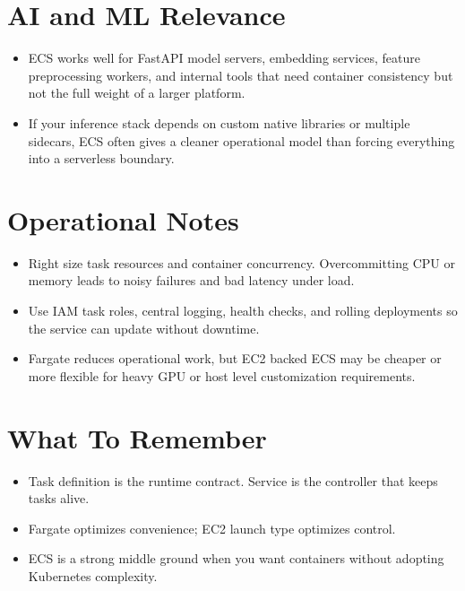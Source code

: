 \documentclass[10pt,twocolumn]{article}
\begin{document}
\section*{AI and ML Relevance}
\begin{itemize}
\item ECS works well for FastAPI model servers, embedding services, feature preprocessing workers, and internal tools that need container consistency but not the full weight of a larger platform.
\item If your inference stack depends on custom native libraries or multiple sidecars, ECS often gives a cleaner operational model than forcing everything into a serverless boundary.
\end{itemize}

\section*{Operational Notes}
\begin{itemize}
\item Right size task resources and container concurrency. Overcommitting CPU or memory leads to noisy failures and bad latency under load.
\item Use IAM task roles, central logging, health checks, and rolling deployments so the service can update without downtime.
\item Fargate reduces operational work, but EC2 backed ECS may be cheaper or more flexible for heavy GPU or host level customization requirements.
\end{itemize}

\section*{What To Remember}
\begin{itemize}
\item Task definition is the runtime contract. Service is the controller that keeps tasks alive.
\item Fargate optimizes convenience; EC2 launch type optimizes control.
\item ECS is a strong middle ground when you want containers without adopting Kubernetes complexity.
\end{itemize}
\end{document}
